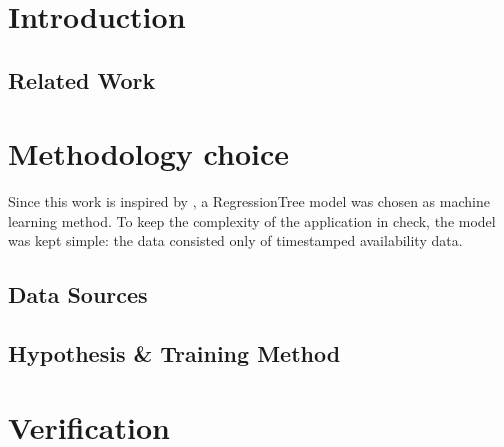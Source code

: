 \section{Introduction}


\subsection{Related Work}



\section{Methodology choice}

Since this work is inspired by \cite{parkendd}, a RegressionTree model was chosen as machine learning method. To keep the complexity of the application in check, the model was kept simple: the data consisted only of timestamped availability data.

\subsection{Data Sources}\label{data sources}


\subsection{Hypothesis \& Training Method}


\section{Verification}





